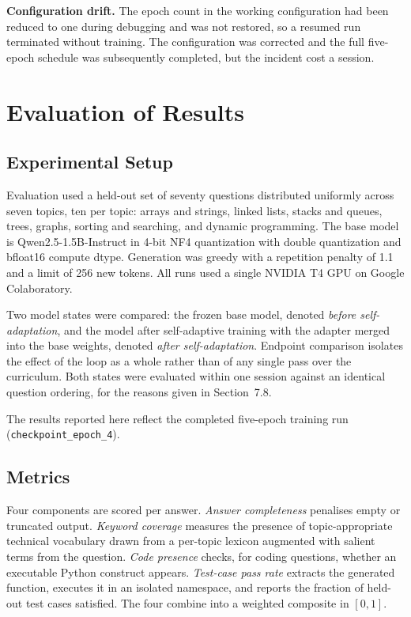 \documentclass[12pt,a4paper]{report}
\begin{document}
\textbf{Configuration drift.} The epoch count in the working configuration had been reduced to one during debugging and was not restored, so a resumed run terminated without training. The configuration was corrected and the full five-epoch schedule was subsequently completed, but the incident cost a session.

\chapter{Evaluation of Results}

\section{Experimental Setup}

Evaluation used a held-out set of seventy questions distributed uniformly across seven topics, ten per topic: arrays and strings, linked lists, stacks and queues, trees, graphs, sorting and searching, and dynamic programming. The base model is Qwen2.5-1.5B-Instruct in 4-bit NF4 quantization with double quantization and bfloat16 compute dtype. Generation was greedy with a repetition penalty of 1.1 and a limit of 256 new tokens. All runs used a single NVIDIA T4 GPU on Google Colaboratory.

Two model states were compared: the frozen base model, denoted \textit{before self-adaptation}, and the model after self-adaptive training with the adapter merged into the base weights, denoted \textit{after self-adaptation}. Endpoint comparison isolates the effect of the loop as a whole rather than of any single pass over the curriculum. Both states were evaluated within one session against an identical question ordering, for the reasons given in Section~7.8.

The results reported here reflect the completed five-epoch training run (\texttt{checkpoint\_epoch\_4}).

\section{Metrics}

Four components are scored per answer. \textit{Answer completeness} penalises empty or truncated output. \textit{Keyword coverage} measures the presence of topic-appropriate technical vocabulary drawn from a per-topic lexicon augmented with salient terms from the question. \textit{Code presence} checks, for coding questions, whether an executable Python construct appears. \textit{Test-case pass rate} extracts the generated function, executes it in an isolated namespace, and reports the fraction of held-out test cases satisfied. The four combine into a weighted composite in $[0, 1]$.
\end{document}
